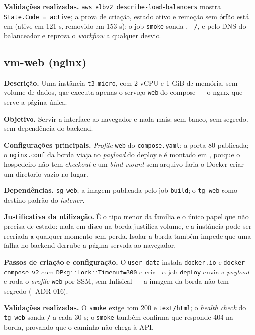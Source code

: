 \documentclass[11pt,a4paper]{article}
\begin{document}
\textbf{Validações realizadas.} \texttt{aws elbv2 describe-load-balancers} mostra
\texttt{State.Code = active}; a prova de criação, estado ativo e remoção sem órfão está em
 (ativo em 121 s, removido em 153 s); o job \texttt{smoke}
sonda , , \texttt{/},  e  pelo
DNS do balanceador e reprova o \emph{workflow} a qualquer desvio.

\subsection{vm-web (nginx)}

\textbf{Descrição.} Uma instância \texttt{t3.micro}, com 2 vCPU e 1 GiB de memória, sem volume de
dados, que executa apenas o serviço \texttt{web} do compose --- o nginx que serve a página única.

\textbf{Objetivo.} Servir a interface ao navegador e nada mais: sem banco, sem segredo, sem
dependência do backend.

\textbf{Configurações principais.} \emph{Profile} \texttt{web} do \texttt{compose.yaml}; a porta 80
publicada; o \texttt{nginx.conf} da borda viaja no \emph{payload} do deploy e é montado em
, porque o hospedeiro não tem \emph{checkout} e um \emph{bind mount}
sem arquivo faria o Docker criar um diretório vazio no lugar.

\textbf{Dependências.} \texttt{sg-web}; a imagem  publicada pelo
job \texttt{build}; o \texttt{tg-web} como destino padrão do \emph{listener}.

\textbf{Justificativa da utilização.} É o tipo menor da família e o único papel que não precisa de
estado: nada em disco na borda justifica volume, e a instância pode ser recriada a qualquer momento
sem perda. Isolar a borda também impede que uma falha no backend derrube a página servida ao navegador.

\textbf{Passos de criação e configuração.} O \texttt{user\_data} instala \texttt{docker.io} e
\texttt{docker-compose-v2} com \texttt{DPkg::Lock::Timeout=300} e cria ; o job
\texttt{deploy} envia o \emph{payload} e roda o \emph{profile} \texttt{web} por SSM, sem Infisical
--- a imagem da borda não tem segredo (, ADR-016).

\textbf{Validações realizadas.} O \texttt{smoke} exige  com 200 e
\texttt{text/html}; o \emph{health check} do \texttt{tg-web} sonda \texttt{/} a cada 30 s; o
\texttt{smoke} também confirma que  responde 404 na borda, provando que o caminho
não chega à API.
\end{document}
